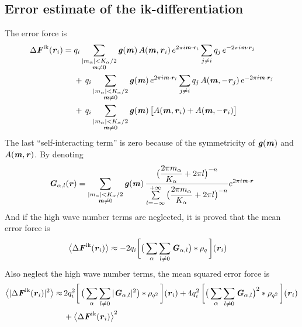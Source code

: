 \documentclass[aps,pre,preprint]{revtex4-1}
\renewcommand{\v}[1]{\textbf{\textit{#1}}}
\begin{document}
\subsection{Error estimate of the ik-differentiation}
The error force is 
\begin{align}\nonumber
  \Delta\v F^{\textrm{ik}}(\v r_i)
  =\;&
  q_i
  \sum_{
    \begin{subarray}{c}
      \vert m_{\alpha}\vert < K_\alpha/2\\
      \v m\neq 0
    \end{subarray}}
  \v g(\v m)\,
  A(\v m, \v r_i)\,
  e^{2\pi i\v m\cdot \v r_i}
  \sum_{j\neq i}q_j\,e^{-2\pi i\v m\cdot\v r_j} \\\nonumber
  & +\,
  q_i
  \sum_{
    \begin{subarray}{c}
      \vert m_{\alpha}\vert < K_\alpha/2\\
      \v m\neq 0
    \end{subarray}}
  \v g(\v m)\,
  e^{2\pi i\v m\cdot \v r_i}
  \sum_{j\neq i}q_j\,A(\v m, -\v r_j)\,e^{-2\pi i\v m\cdot\v r_j}\\\nonumber
  & +\,
  q_i
  \sum_{
    \begin{subarray}{c}
      \vert m_{\alpha}\vert < K_\alpha/2\\
      \v m\neq 0
    \end{subarray}}
  \v g(\v m)\,
  \big[
  A(\v m, \v r_i) +
  A(\v m, -\v r_i)
  \big]
\end{align}
The last ``self-interacting term'' is zero because of the symmetricity
of $\v g(\v m)$ and $A(\v m, \v r)$. 
By denoting
\begin{align}
  \v G_{\alpha,l}(\v r) =
  \sum_{
    \begin{subarray}{c}
      \vert m_{\alpha}\vert < K_\alpha/2\\
      \v m\neq 0
    \end{subarray}}
  \v g(\v m)\,
  \frac
  {\big(\dfrac{2\pi m_\alpha}{K_\alpha} + 2\pi l\big)^{-n}}
  {\sum\limits_{l=-\infty}^{+\infty}
    \big(\dfrac{2\pi m_\alpha}{K_\alpha} + 2\pi l\big)^{-n}}
  e^{2\pi i\v m\cdot\v r}
\end{align}
And if the high wave number terms are neglected, it is proved that the
mean error force is
\begin{align}
  \big\langle
  \Delta\v F^{\textrm{ik}}(\v r_i)
  \big\rangle
  & \approx
  - 2 q_i
  \bigg[
  \big(
  \sum_{\alpha}\sum_{l\neq 0}\v G_{\alpha,l}
  \big)
  \ast\rho_q\,
  \bigg] (\v r_i)
\end{align}
Also neglect the high wave number terms, the mean squared error force is 
\begin{align}\nonumber
  \big\langle
  \vert\Delta\v F^{\textrm{ik}}(\v r_i)\vert^2
  \big\rangle
  \approx&\, 
  2q_i^2
  \bigg[\,
  \big(
  \sum_{\alpha} \sum_{l\neq 0}
  \vert \v G_{\alpha,l}\vert^2
  \big)
  \ast \rho_{q^2}
  \,\bigg] (\v r_i)
  +
  4q_i^2\,
  \bigg[
  \big(
  \sum_{\alpha} \sum_{l\neq 0}  
  \v G_{\alpha,l}
  \big)^2
  \ast \rho_{q^2}\,
  \bigg] (\v r_i) \\
  &\,+
  \big\langle
  \Delta\v F^{\textrm{ik}}(\v r_i)
  \big\rangle  ^2
\end{align}
\end{document}
